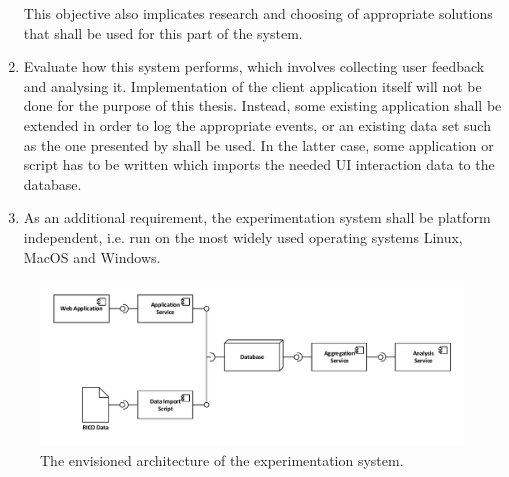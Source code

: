 \begin{enumerate}
This objective also implicates research and choosing of appropriate solutions that shall be used for this part of the system.
\item Evaluate how this system performs, which involves collecting user feedback and analysing it.
Implementation of the client application itself will not be done for the purpose of this thesis.
Instead, some existing application shall be extended in order to log the appropriate events, or an existing data set such as the one presented by \citet{Deka:2017:Rico} shall be used.
In the latter case, some application or script has to be written which imports the needed UI interaction data to the database.
\item As an additional requirement, the experimentation system shall be platform independent, i.e. run on the most widely used operating systems Linux, MacOS and Windows.
\end{enumerate}

\begin{figure}[htb]
        \includegraphics[width=\textwidth]{gfx/architecture-1}
        \caption{The envisioned architecture of the experimentation system.}
        \label{fig:system:vision}
\end{figure}
